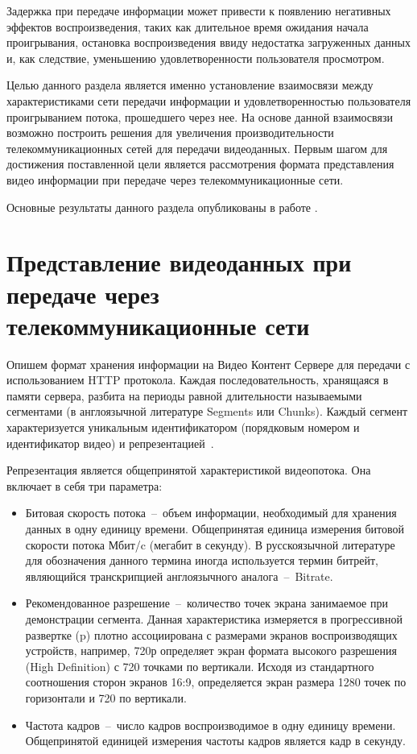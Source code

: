 Задержка при передаче информации может привести к появлению негативных эффектов воспроизведения, таких как длительное время ожидания начала проигрывания, остановка воспроизведения ввиду недостатка загруженных данных и, как следствие, уменьшению удовлетворенности пользователя просмотром.

Целью данного раздела является именно установление взаимосвязи между характеристиками сети передачи информации и удовлетворенностью пользователя проигрыванием потока, прошедшего через нее. На основе данной взаимосвязи возможно построить решения для увеличения производительности телекоммуникационных сетей для передачи видеоданных. Первым шагом для достижения поставленной цели является рассмотрения формата представления видео информации при передаче через телекоммуникационные сети.

Основные результаты данного раздела опубликованы в работе \cite{past_ius}.

\section{Представление видеоданных при передаче через телекоммуникационные сети}
\label{chap1:VideoFormat}

Опишем формат хранения информации на Видео Контент Сервере для передачи с использованием HTTP протокола. Каждая последовательность, хранящаяся в памяти сервера, разбита на периоды равной длительности называемыми сегментами (в англоязычной литературе Segments или Chunks). Каждый сегмент характеризуется уникальным идентификатором (порядковым номером и идентификатор видео) и репрезентацией~\cite{dash_standard}.

Репрезентация является общепринятой характеристикой видеопотока. Она включает в себя три параметра:
\begin{itemize}
  \item Битовая скорость потока~--~объем информации, необходимый для хранения данных в одну единицу времени. Общепринятая единица измерения битовой скорости потока Мбит/c (мегабит в секунду). В русскоязычной литературе для обозначения данного термина иногда используется термин битрейт, являющийся транскрипцией англоязычного аналога~--~Bitrate.
  \item Рекомендованное разрешение~--~количество точек экрана занимаемое при демонстрации сегмента. Данная характеристика измеряется в прогрессивной развертке (p) плотно ассоциирована с размерами экранов воспроизводящих устройств, например, 720р определяет экран формата высокого разрешения (High Definition) с 720 точками по вертикали. Исходя из стандартного соотношения сторон экранов 16:9, определяется экран размера 1280 точек по горизонтали и 720 по вертикали.
  \item Частота кадров~--~число кадров воспроизводимое в одну единицу времени. Общепринятой единицей измерения частоты кадров является кадр в секунду.
\end{itemize}

